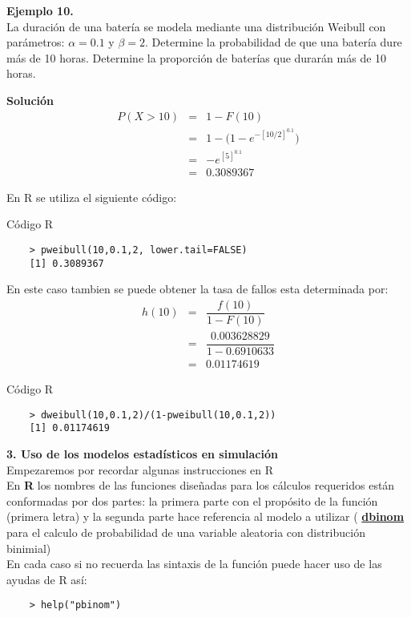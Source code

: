\documentclass[base=hide,12pt]{elegantbook}
\begin{document}
\vspace{.5cm} 
\textcolor{col3}{\bf \large Ejemplo 10.}\\
 La duración de una batería se modela mediante una distribución Weibull con parámetros: $\alpha=0.1$ y $\beta=2$. Determine la probabilidad de que una batería dure más de 10 horas. Determine la proporción de baterías que durarán más de 10 horas.

\textcolor{col3}{\bf \large Solución}\\
\begin{eqnarray*}
	P(X > 10) &=& 1- F(10)\\
	&=& 1-\Big(1-e^{-[10/2]^{0.1}}\Big)\\
	&=& -e^{[5]^{0.1}}\\
	&=& 0.3089367 
\end{eqnarray*}

En R se utiliza el siguiente código: 
\begin{Box3}{Código R}
\begin{verbatim}
	> pweibull(10,0.1,2, lower.tail=FALSE)
	[1] 0.3089367
\end{verbatim}
\end{Box3}

En este caso tambien se puede obtener  la tasa de fallos esta determinada por:
\begin{eqnarray*}
	h(10)&=&\dfrac{f(10)}{1-F(10)}\\
	&=& \dfrac{0.003628829}{1-0.6910633}\\
	&=& 0.01174619
\end{eqnarray*}


\begin{Box3}{Código R }
\begin{verbatim} 	
	> dweibull(10,0.1,2)/(1-pweibull(10,0.1,2))
	[1] 0.01174619
\end{verbatim}	
\end{Box3}

\newpage
\textcolor{col4}{\LARGE  \bf 3. Uso de los modelos estadísticos en simulación}\\

Empezaremos por recordar algunas instrucciones en R\\

En {\bf R} los nombres de las funciones diseñadas para los cálculos requeridos están conformadas por dos partes: la primera parte con el propósito de la función (primera letra)  y la segunda parte hace referencia al modelo a utilizar ( {\bf \underline{d}\hspace{.05cm}\underline{binom}} para el calculo de probabilidad de una variable aleatoria con distribución binimial)
\\
En cada caso si no recuerda las sintaxis de la función puede hacer uso de las ayudas de R así:
\begin{lstlisting}
	> help("pbinom")
\end{lstlisting}
\end{document}
